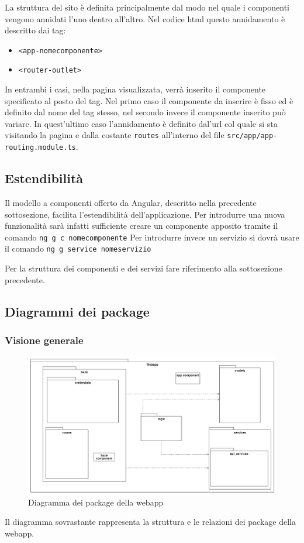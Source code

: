 La struttura del sito è definita principalmente dal modo nel quale i componenti vengono annidati l'uno dentro all'altro. Nel codice html questo annidamento è descritto dai tag:
\begin{itemize}
	\item \texttt{<app-nomecomponente>}
	\item \texttt{<router-outlet>}
\end{itemize}
In entrambi i casi, nella pagina visualizzata, verrà inserito il componente specificato al posto del tag. Nel primo caso il componente da inserire è fisso ed è definito dal nome del tag stesso, nel secondo invece il componente inserito può variare. In quest'ultimo caso l'annidamento è definito dal'url col quale si sta visitando la pagina e dalla costante \texttt{routes} all'interno del file \texttt{src/app/app-routing.module.ts}.

\subsection{Estendibilità}
Il modello a componenti offerto da Angular, descritto nella precedente sottosezione, facilita l'estendibilità dell'applicazione. Per introdurre una nuova funzionalità sarà infatti sufficiente creare un componente apposito tramite il comando \newline
	\texttt{ng g c nomecomponente} \newline
Per introdurre invece un servizio si dovrà usare il comando \newline
	\texttt{ng g service nomeservizio} \newline

Per la struttura dei componenti e dei servizi fare riferimento alla sottosezione precedente.

\subsection{Diagrammi dei package}

\subsubsection{Visione generale}
\begin{figure}[H]
	\centering
	\includegraphics[width=18cm]{res/images/webapp-totale-diagrammaPackage.png}
	\caption{Diagramma dei package della webapp}
	\label{fig:DiagrammaPackageWebapp}
\end{figure}
Il diagramma sovrastante rappresenta la struttura e le relazioni dei package della webapp.

